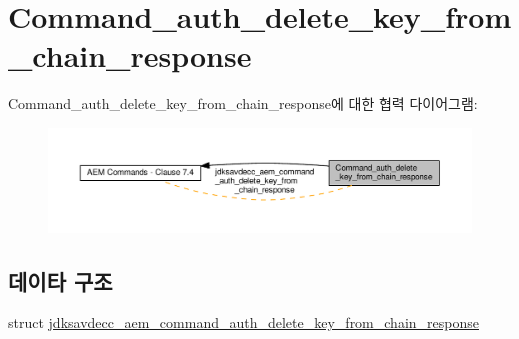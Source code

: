 \hypertarget{group__command__auth__delete__key__from__chain__response}{}\section{Command\+\_\+auth\+\_\+delete\+\_\+key\+\_\+from\+\_\+chain\+\_\+response}
\label{group__command__auth__delete__key__from__chain__response}
Command\+\_\+auth\+\_\+delete\+\_\+key\+\_\+from\+\_\+chain\+\_\+response에 대한 협력 다이어그램\+:
\nopagebreak
\begin{figure}[H]
\begin{center}
\leavevmode
\includegraphics[width=350pt]{group__command__auth__delete__key__from__chain__response}
\end{center}
\end{figure}
\subsection*{데이타 구조}
\begin{DoxyCompactItemize}
\item 
struct \hyperlink{structjdksavdecc__aem__command__auth__delete__key__from__chain__response}{jdksavdecc\+\_\+aem\+\_\+command\+\_\+auth\+\_\+delete\+\_\+key\+\_\+from\+\_\+chain\+\_\+response}
\end{DoxyCompactItemize}
